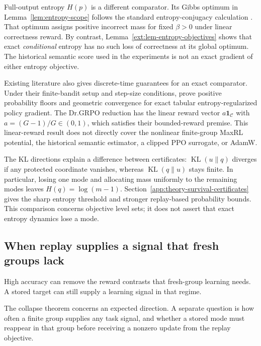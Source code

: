 \documentclass{article}
\newcommand{\1}{\mathbf 1}
\theoremstyle{remark}
\theoremstyle{definition}
\theoremstyle{plain}
\begin{document}
Full-output entropy $H(p)$ is a different comparator. Its Gibbs optimum in
Lemma~\ref{lem:entropy-scope} follows the standard entropy-conjugacy
calculation \citep[Section~2.2]{geist2019regmdp}. That optimum assigns positive
incorrect mass for fixed $\beta>0$ under linear correctness reward. By
contrast, Lemma~\ref{ext:lem-entropy-objectives} shows that exact
\emph{conditional} entropy has no such loss of correctness at its global
optimum. The historical semantic score used in the experiments is not an
exact gradient of either entropy objective.

Existing literature also gives discrete-time guarantees for an exact
comparator. Under their finite-bandit setup and step-size conditions,
\citet[Lemma~13 and Theorem~5]{mei2020softmaxpg} prove positive
probability floors and geometric convergence for exact tabular
entropy-regularized policy gradient. The Dr.GRPO reduction has the linear
reward vector $a\mathbf 1_{\mathcal C}$ with $a=(G-1)/G\in(0,1)$, which
satisfies their bounded-reward premise. This linear-reward result does not
directly cover the nonlinear finite-group MaxRL potential, the historical
semantic estimator, a clipped PPO surrogate, or AdamW.

The KL directions explain a difference between certificates:
$\operatorname{KL}(u\|q)$ diverges if any protected coordinate vanishes,
whereas $\operatorname{KL}(q\|u)$ stays finite. In particular, losing one
mode and allocating mass uniformly to the remaining modes leaves
$H(q)=\log(m-1)$. Section~\ref{app:theory-survival-certificates} gives the
sharp entropy threshold and stronger replay-based probability bounds.
This comparison concerns objective level sets; it does not assert that exact
entropy dynamics lose a mode.

\subsection{When replay supplies a signal that fresh groups lack}
\label{app:theory-gradient-availability}

High accuracy can remove the reward contrasts that fresh-group learning
needs. A stored target can still supply a learning signal in that regime.


The collapse theorem concerns an expected direction. A separate question is
how often a finite group supplies any task signal, and whether a stored mode
must reappear in that group before receiving a nonzero update from the replay objective.
\end{document}
